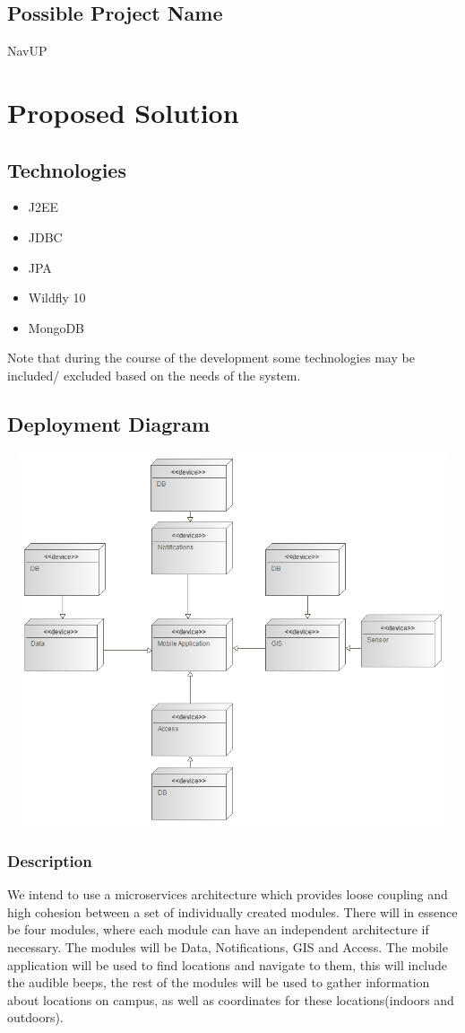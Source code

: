 \documentclass{article}
\begin{document}
\subsection{Possible Project Name}
NavUP

\newpage
\section{Proposed Solution}

\subsection{Technologies}
\begin{itemize}
	\item J2EE
	\item JDBC
	\item JPA
	\item Wildfly 10
	\item MongoDB
\end{itemize}
Note that during the course of the development some technologies may be included/ excluded based on the needs of the system.
\subsection{Deployment Diagram}
\includegraphics[width=20cm,height=11cm,keepaspectratio]{dd1.png} \\

\subsubsection{Description}
We intend to use a microservices architecture which provides loose coupling and high cohesion between a set of individually created modules. There will in essence be four modules, where each module can have an independent architecture if necessary. The modules will be Data, Notifications, GIS and Access. The mobile application will be used to find locations and navigate to them, this will include the audible beeps, the rest of the modules will be used to gather information about locations on campus, as well as coordinates for these locations(indoors and outdoors).
\end{document}

